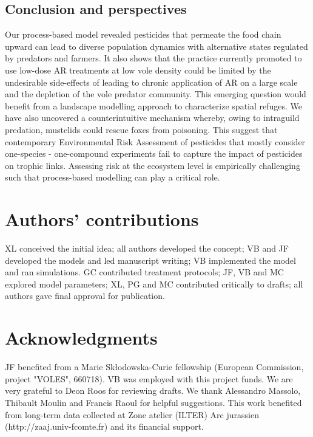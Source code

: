 \documentclass[11pt]{article}
\begin{document}
\subsection{Conclusion and perspectives}

Our process-based model revealed pesticides that permeate the food chain upward can lead to diverse population dynamics with alternative states regulated by predators and farmers. It also shows that the practice currently promoted to use low-dose AR treatments at low vole density could be limited by the undesirable side-effects of leading to chronic application of AR on a large scale and the depletion of the vole predator community. This emerging question would benefit from a landscape modelling approach to characterize spatial refuges. We have also uncovered a counterintuitive mechanism whereby, owing to intraguild predation, mustelids could rescue foxes from poisoning. This suggest that contemporary Environmental Risk Assessment of pesticides that mostly consider one-species - one-compound experiments fail to capture the impact of pesticides on trophic links.  Assessing risk at the ecosystem level is empirically challenging such that process-based modelling can play a critical role. 

\section*{Authors’ contributions}
	
XL conceived the initial idea; all authors developed the concept; VB and JF developed the models and led manuscript writing; VB implemented the model and ran simulations. GC contributed treatment protocols; JF, VB and MC explored model parameters; XL, PG and MC contributed critically to drafts; all authors gave final approval for publication.


\section*{Acknowledgments}

JF benefited from a Marie Skłodowska-Curie fellowship (European Commission, project "VOLES", 660718). VB was employed with this project funds. We are very grateful to Deon Roos for reviewing drafts. We thank Alessandro Massolo, Thibault Moulin and Francis Raoul for helpful suggestions. This work benefited from long-term data collected at Zone atelier (ILTER) Arc jurassien (http://zaaj.univ-fcomte.fr) and its financial support.
\end{document}

